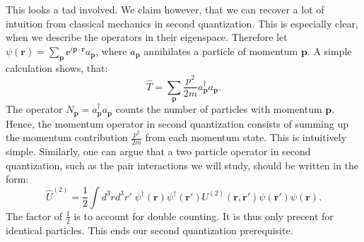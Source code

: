 This looks a tad involved. We claim however, that we can recover a lot of intuition from classical mechanics in second quantization. This is especially clear, when we describe the operators in their eigenspace. Therefore let $\psi(\mathbf{r}) = \sum_{\mathbf{p}} \text{e}^{i\mathbf{p}\cdot \mathbf{r}} a_\mathbf{p}$, where $a_\mathbf{p}$ annihilates a particle of momentum $\mathbf{p}$. A simple calculation shows, that:
\begin{equation}
\hat{T} = \sum_\mathbf{p} \frac{p^2}{2m} a^\dagger_\mathbf{p}a_\mathbf{p}.
\end{equation}
The operator $N_\mathbf{p} = a^\dagger_\mathbf{p}a_\mathbf{p}$ counts the number of particles with momentum $\mathbf{p}$. Hence, the momentum operator in second quantization consists of summing up the momentum contribution $\frac{p^2}{2m}$ from each momentum state. This is intuitively simple. Similarly, one can argue that a two particle operator in second quantization, such as the pair interactions we will study, should be written in the form:
\begin{equation}
\hat{U}^{(2)} = \frac{1}{2}\int d^3 r d^3 r' \; \psi^\dagger(\mathbf{r}) \psi^\dagger(\mathbf{r}') U^{(2)}(\mathbf{r},\mathbf{r}')\psi(\mathbf{r}')\psi(\mathbf{r}). 
\label{eq.InteractionHamiltonain2ndQuantization} 
\end{equation}
The factor of $\frac{1}{2}$ is to account for double counting. It is thus only precent for identical particles. This ends our second quantization prerequisite. 

